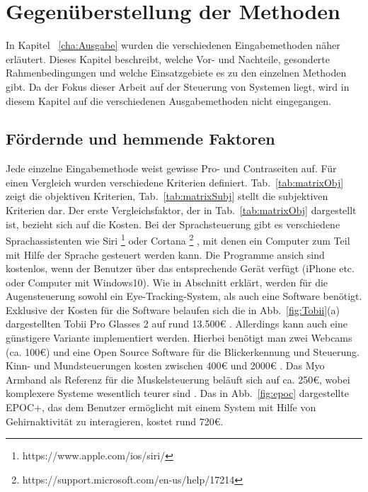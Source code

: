 \chapter{Gegenüberstellung der Methoden}
\label{cha:Vergleich}

In Kapitel ~\ref{cha:Ausgabe} wurden die verschiedenen Eingabemethoden näher erläutert. Dieses Kapitel beschreibt, welche Vor- und Nachteile, gesonderte Rahmenbedingungen und welche Einsatzgebiete es zu den einzelnen Methoden gibt. Da der Fokus dieser Arbeit auf der Steuerung von Systemen liegt, wird in diesem Kapitel auf die verschiedenen Ausgabemethoden nicht eingegangen.

\section{Fördernde und hemmende Faktoren}
%
Jede einzelne Eingabemethode weist gewisse Pro- und Contraseiten auf. Für einen Vergleich wurden verschiedene Kriterien definiert. Tab.~\ref{tab:matrixObj} zeigt die objektiven Kriterien, Tab.~\ref{tab:matrixSubj} stellt die subjektiven Kriterien dar.
\newline \newline
Der erste Vergleichsfaktor, der in Tab.~\ref{tab:matrixObj} dargestellt ist, bezieht sich auf die Kosten. Bei der Sprachsteuerung gibt es verschiedene Sprachassistenten wie \zB Siri%
\footnote{https://www.apple.com/ios/siri/}
%
 oder Cortana%
\footnote{https://support.microsoft.com/en-us/help/17214}
%
 , mit denen ein Computer zum Teil mit Hilfe der Sprache gesteuert werden kann. Die Programme ansich sind kostenlos, wenn der Benutzer über das entsprechende Gerät verfügt (iPhone etc. oder Computer mit Windows10).
Wie in Abschnitt \label{cha:Augensteuerung} erklärt, werden für die Augensteuerung sowohl ein Eye-Tracking-System, als auch eine Software benötigt. Exklusive der Kosten für die Software belaufen sich die in Abb.~\ref{fig:Tobii}(a) dargestellten Tobii Pro Glasses 2 auf rund 13.500€ \cite{TobiiCosts}. Allerdings kann auch eine günstigere Variante implementiert werden. Hierbei benötigt man zwei Webcams (ca. 100€) und eine Open Source Software für die Blickerkennung und Steuerung. Kinn- und Mundsteuerungen kosten zwischen 400€ und 2000€ \cite{SENSORY} \cite{INTEGRA}. Das Myo Armband als Referenz für die Muskelsteuerung beläuft sich auf ca. 250€, wobei komplexere Systeme wesentlich teurer sind \cite{myoBand}. Das in Abb.~\ref{fig:epoc} dargestellte EPOC+, das dem Benutzer ermöglicht mit einem System mit Hilfe von Gehirnaktivität zu interagieren, kostet rund 720€.
